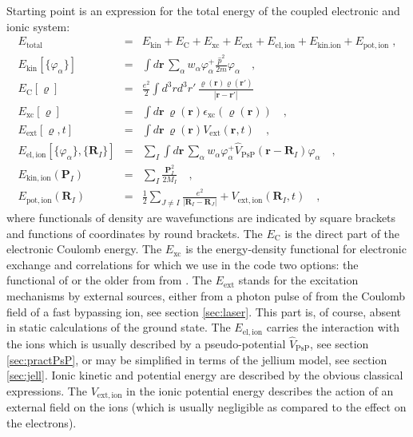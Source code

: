 \documentclass[final,1p]{elsarticle}
\begin{document}
Starting point is an expression for the total energy of the coupled
electronic and ionic system:
\begin{subequations}
\label{eq:Etotal}
\begin{eqnarray}
  E_\mathrm{total}
  &=&
  E_\mathrm{kin}
  +
  E_\mathrm{C}
  +
  E_\mathrm{xc}
  +
  E_\mathrm{ext}
  +
  E_\mathrm{el,ion}
  +
  E_\mathrm{kin.ion}
  +
  E_\mathrm{pot,ion}
  \;,
\\
  E_\mathrm{kin}[\{\varphi_\alpha\}]
  &=&
  \int d\mathbf{r}\,\sum_\alpha w_\alpha
  \varphi_\alpha^+\frac{\hat{p}^2}{2m}\varphi_\alpha^{\mbox{}}
  \quad,
\label{eq:Ekin}
\\
  E_\mathrm{C}[\varrho]
  &=&
  \frac{e^2}{2}\int d^3rd^3r'\,
  \frac{\varrho(\mathbf{r})\varrho(\mathbf{r}')}{|\mathbf{r}-\mathbf{r}'|}
\\
  E_\mathrm{xc}[\varrho]
  &=&
  \int d\mathbf{r}\,\varrho(\mathbf{r})
  \epsilon_\mathrm{xc}\left(\varrho(\mathbf{r})\right)
  \quad,
\\
  E_\mathrm{ext}[\varrho,t]
  &=&
  \int d\mathbf{r}\,\varrho(\mathbf{r})V_\mathrm{ext}(\mathbf{r},t)
  \quad,
\\
  E_\mathrm{el,ion}[\{\varphi_\alpha\},\{\mathbf{R}_I\}]
  &=&
  \sum_I\int d\mathbf{r}\,\sum_\alpha w_\alpha
  \varphi_\alpha^+
  \hat{V}_\mathrm{PsP}(\mathbf{r}-\mathbf{R}_I)\varphi_\alpha^{\mbox{}}
  \quad,
\\
  E_\mathrm{kin,ion}(\mathbf{P}_I)
  &=&
  \sum_I\frac{\mathbf{P}_I^2}{2M_I}
  \quad,
\\
  E_\mathrm{pot,ion}(\mathbf{R}_I)
  &=&
  \frac{1}{2}\sum_{J\neq I}\frac{e^2}{|\mathbf{R}_I-\mathbf{R}_J|}
  +
  V_\mathrm{ext,ion}(\mathbf{R}_I,t)
  \quad,
\end{eqnarray}
\end{subequations}
where functionals of density are wavefunctions are indicated by square
brackets and functions of coordinates by round brackets.  The
$E_\mathrm{C}$ is the direct part of the electronic Coulomb energy.
The $E_\mathrm{xc}$ is the energy-density functional for electronic
exchange and correlations for which we use in the code two options:
the functional of \cite{Per92} or the older from from \cite{Gun76}.
The $E_\mathrm{ext}$ stands for the excitation mechanisms by external
sources, either from a photon pulse of from the Coulomb field of a
fast bypassing ion, see section \ref{sec:laser}. This part is, of
course, absent in static calculations of the ground state.  The
$E_\mathrm{el,ion}$ carries the interaction with the ions which is
usually described by a pseudo-potential $\hat{V}_\mathrm{PsP}$, see
section \ref{sec:practPsP}, or may be simplified in terms of the
jellium model, see section \ref{sec:jell}.  Ionic kinetic and
potential energy are described by the obvious classical expressions.
The $V_\mathrm{ext,ion}$ in the ionic potential energy describes the
action of an external field on the ions (which is usually negligible
as compared to the effect on the electrons).
\end{document}
